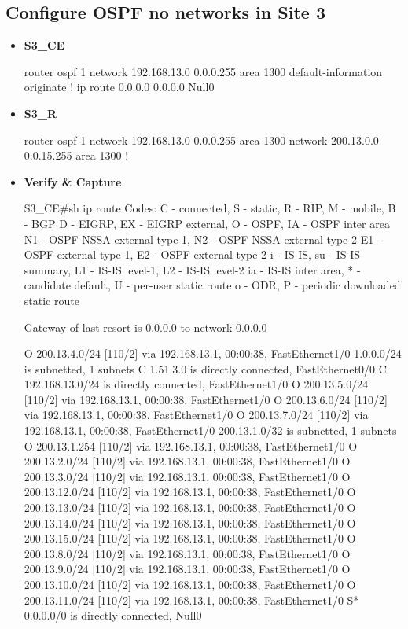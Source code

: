 \documentclass[10pt]{article}
\begin{document}
\subsection{Configure OSPF no networks in Site 3} %
\label{sub:configure_ospf_no_networks_in_site_3}
\begin{itemize}
	\item {\bf S3\_CE}
	\begin{verbatim*}
		router ospf 1
		 network 192.168.13.0 0.0.0.255 area 1300
		 default-information originate
		!
		ip route 0.0.0.0 0.0.0.0 Null0
	\end{verbatim*}
	\item {\bf S3\_R}
	\begin{verbatim*}
		router ospf 1
		 network 192.168.13.0 0.0.0.255 area 1300
		 network 200.13.0.0 0.0.15.255 area 1300
		!
	\end{verbatim*}
	\item {\bf Verify \& Capture}
	\begin{verbatim*}
		S3_CE#sh ip route
		Codes: C - connected, S - static, R - RIP, M - mobile, B - BGP
		       D - EIGRP, EX - EIGRP external, O - OSPF, IA - OSPF inter area
		       N1 - OSPF NSSA external type 1, N2 - OSPF NSSA external type 2
		       E1 - OSPF external type 1, E2 - OSPF external type 2
		       i - IS-IS, su - IS-IS summary, L1 - IS-IS level-1, L2 - IS-IS level-2
		       ia - IS-IS inter area, * - candidate default, U - per-user static route
		       o - ODR, P - periodic downloaded static route

		Gateway of last resort is 0.0.0.0 to network 0.0.0.0

		O    200.13.4.0/24 [110/2] via 192.168.13.1, 00:00:38, FastEthernet1/0
		     1.0.0.0/24 is subnetted, 1 subnets
		C       1.51.3.0 is directly connected, FastEthernet0/0
		C    192.168.13.0/24 is directly connected, FastEthernet1/0
		O    200.13.5.0/24 [110/2] via 192.168.13.1, 00:00:38, FastEthernet1/0
		O    200.13.6.0/24 [110/2] via 192.168.13.1, 00:00:38, FastEthernet1/0
		O    200.13.7.0/24 [110/2] via 192.168.13.1, 00:00:38, FastEthernet1/0
		     200.13.1.0/32 is subnetted, 1 subnets
		O       200.13.1.254 [110/2] via 192.168.13.1, 00:00:38, FastEthernet1/0
		O    200.13.2.0/24 [110/2] via 192.168.13.1, 00:00:38, FastEthernet1/0
		O    200.13.3.0/24 [110/2] via 192.168.13.1, 00:00:38, FastEthernet1/0
		O    200.13.12.0/24 [110/2] via 192.168.13.1, 00:00:38, FastEthernet1/0
		O    200.13.13.0/24 [110/2] via 192.168.13.1, 00:00:38, FastEthernet1/0
		O    200.13.14.0/24 [110/2] via 192.168.13.1, 00:00:38, FastEthernet1/0
		O    200.13.15.0/24 [110/2] via 192.168.13.1, 00:00:38, FastEthernet1/0
		O    200.13.8.0/24 [110/2] via 192.168.13.1, 00:00:38, FastEthernet1/0
		O    200.13.9.0/24 [110/2] via 192.168.13.1, 00:00:38, FastEthernet1/0
		O    200.13.10.0/24 [110/2] via 192.168.13.1, 00:00:38, FastEthernet1/0
		O    200.13.11.0/24 [110/2] via 192.168.13.1, 00:00:38, FastEthernet1/0
		S*   0.0.0.0/0 is directly connected, Null0



\end{verbatim*}
\end{itemize}
\end{document}
